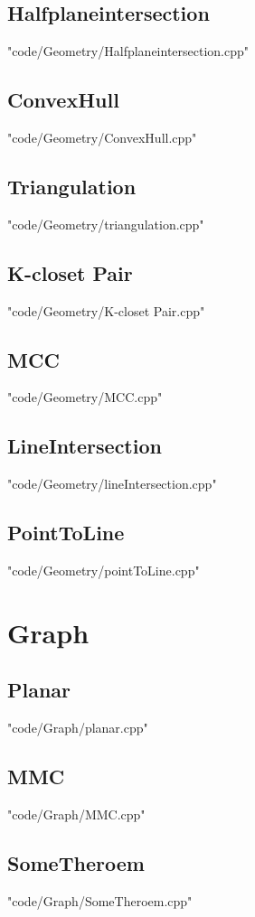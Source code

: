 \documentclass [8pt,a4paper,twocolumn]{article}
\begin{document}
\subsection{Halfplaneintersection}
 {"code/Geometry/Halfplaneintersection.cpp"}
\subsection{ConvexHull}
 {"code/Geometry/ConvexHull.cpp"}
\subsection{Triangulation}
 {"code/Geometry/triangulation.cpp"}
\subsection{K-closet Pair}
 {"code/Geometry/K-closet Pair.cpp"}
\subsection{MCC}
 {"code/Geometry/MCC.cpp"}
\subsection{LineIntersection}
 {"code/Geometry/lineIntersection.cpp"}
\subsection{PointToLine}
 {"code/Geometry/pointToLine.cpp"}
\section{Graph}
\subsection{Planar}
 {"code/Graph/planar.cpp"}
\subsection{MMC}
 {"code/Graph/MMC.cpp"}
\subsection{SomeTheroem}
 {"code/Graph/SomeTheroem.cpp"}
\end{document}
